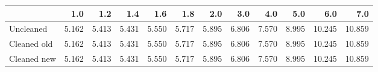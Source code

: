 \begin{tabular}{lrrrrrrrrrrr}
\toprule
{} &   1.0 &   1.2 &   1.4 &   1.6 &   1.8 &   2.0 &   3.0 &   4.0 &   5.0 &    6.0 &    7.0 \\
\midrule
Uncleaned   & 5.162 & 5.413 & 5.431 & 5.550 & 5.717 & 5.895 & 6.806 & 7.570 & 8.995 & 10.245 & 10.859 \\
Cleaned old & 5.162 & 5.413 & 5.431 & 5.550 & 5.717 & 5.895 & 6.806 & 7.570 & 8.995 & 10.245 & 10.859 \\
Cleaned new & 5.162 & 5.413 & 5.431 & 5.550 & 5.717 & 5.895 & 6.806 & 7.570 & 8.995 & 10.245 & 10.859 \\
\bottomrule
\end{tabular}
